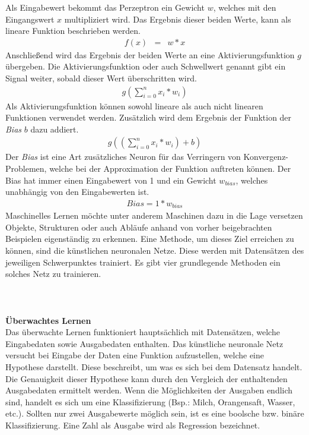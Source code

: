Als Eingabewert bekommt das Perzeptron ein Gewicht $w$, welches mit den Eingangswert $x$ multipliziert wird. Das Ergebnis dieser beiden Werte, kann als lineare Funktion beschrieben werden.
\begin{eqnarray} f(x) & = & w*x \end{eqnarray}
Anschließend wird das Ergebnis der beiden Werte an eine Aktivierungsfunktion $g$ übergeben. Die Aktivierungsfunktion oder auch Schwellwert genannt gibt ein Signal weiter, sobald dieser Wert überschritten wird.
\begin{eqnarray} g( \sum_{i=0}^n x_{i} *w_{i}) \end{eqnarray}
Als Aktivierungsfunktion können sowohl lineare als auch nicht linearen Funktionen verwendet werden. Zusätzlich wird dem Ergebnis der Funktion der \textit{Bias} $b$ dazu addiert.
\begin{eqnarray} g(( \sum_{i=0}^n x_{i} *w_{i}) +b) \end{eqnarray}
Der \textit{Bias} ist eine Art zusätzliches Neuron für das Verringern von Konvergenz-Problemen, welche bei der Approximation der Funktion auftreten können. Der Bias hat immer einen Eingabewert von 1 und ein Gewicht $w_{bias}$, welches unabhängig von den Eingabewerten ist.
\begin{eqnarray} Bias = 1*w_{bias} \end{eqnarray}
Maschinelles Lernen möchte unter anderem Maschinen dazu in die Lage versetzen Objekte, Strukturen oder auch Abläufe anhand von vorher beigebrachten Beispielen eigenständig zu erkennen. Eine Methode, um dieses Ziel erreichen zu können, sind die künstlichen neuronalen Netze. Diese werden mit Datensätzen des jeweiligen Schwerpunktes trainiert. Es gibt vier grundlegende Methoden ein solches Netz zu trainieren.\\\\\\\\
\textbf{Überwachtes Lernen}\\
Das überwachte Lernen funktioniert hauptsächlich mit Datensätzen, welche Eingabedaten sowie Ausgabedaten enthalten. Das künstliche neuronale Netz versucht bei Eingabe der Daten eine Funktion aufzustellen, welche eine Hypothese darstellt. Diese beschreibt, um was es sich bei dem Datensatz handelt. Die Genauigkeit dieser Hypothese kann durch den Vergleich der enthaltenden Ausgabedaten ermittelt werden. Wenn die Möglichkeiten der Ausgaben endlich sind, handelt es sich um eine Klassifizierung (Bsp.: Milch, Orangensaft, Wasser, etc.). Sollten nur zwei Ausgabewerte möglich sein, ist es eine boolsche bzw. binäre Klassifizierung. Eine Zahl als Ausgabe wird als Regression bezeichnet.\\\\
